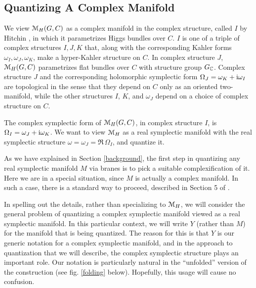 \documentclass[11pt,a4paper]{article}
\begin{document}
\subsection{Quantizing A Complex Manifold}\label{cm}

We view ${\mathcal M}_H(G,C)$ as a complex manifold in the complex structure, called $I$ by Hitchin \cite{H}, in which it parametrizes Higgs bundles over $C$.
$I$ is one of a triple of complex structures $I,J,K$ that, along with the corresponding Kahler forms $\omega_I,\omega_J,\omega_K$, 
make a hyper-Kahler structure on $C$.   In complex structure $J$, ${\mathcal M}_H(G,C)$ parametrizes flat bundles over $C$ with structure group $G_{\mathbb C}$.
Complex structure $J$ and the corresponding holomorphic symplectic form $\Omega_J=\omega_K+{\mathrm i}\omega_I$ are topological in the sense that they
depend on $C$ only as an oriented two-manifold, while the other structures $I$, $K$, and $\omega_J$ depend on a choice of complex structure on $C$.





The complex symplectic form of ${\mathcal M}_H(G,C)$, in complex structure $I$, is $\Omega_I=\omega_J+{\mathrm i}\omega_K$.    We want to view ${\mathcal M}_H$ as a real symplectic
manifold with the real symplectic structure $\omega=\omega_J=\Re\,\Omega_I$, and quantize it.

As we have  explained in Section \ref{background}, the first step in quantizing any real symplectic manifold $M$ via branes is to pick a suitable complexification
of it.    Here we are in a special situation, since $M$ is actually a complex manifold.   
In such a case, there
 is a standard way to proceed, described in Section 5 of \cite{GW}.
   
 In spelling out the details, rather than specializing to ${\mathcal M}_H$, we will consider the general problem of quantizing a complex symplectic manifold viewed as a real
 symplectic manifold.    In this particular context, we will write $Y$ (rather than $M$) for the manifold that is being quantized.   The reason for this  is
 that $Y$ is our generic notation for a complex symplectic manifold, and in the approach to quantization that we will describe, the complex symplectic
 structure plays an important role.     Our notation is particularly natural in the
  ``unfolded'' version of the construction (see fig. \ref{folding} below).   Hopefully, this usage will cause no confusion.

 
 
\end{document}
